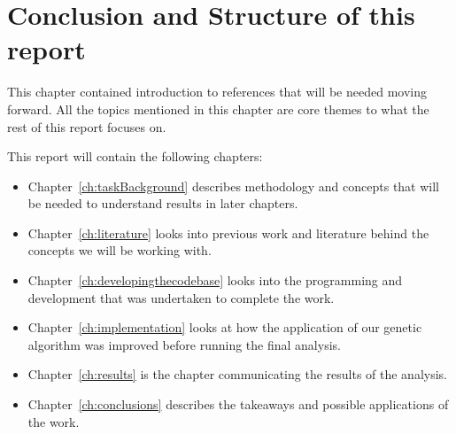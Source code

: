 \section{Conclusion and Structure of this report}
This chapter contained introduction to references that will be needed moving forward. 
All the topics mentioned in this chapter are core themes to what the rest of this report focuses on.

This report will contain the following chapters:
\begin{itemize}
    \item Chapter~\ref{ch:taskBackground} describes methodology and concepts that will be needed to understand results in later chapters.
    \item Chapter~\ref{ch:literature} looks into previous work and literature behind the concepts we will be working with.
    \item Chapter~\ref{ch:developingthecodebase} looks into the programming and development that was undertaken to complete the work.
    \item Chapter~\ref{ch:implementation} looks at how the application of our genetic algorithm was improved before running the final analysis.
    \item Chapter~\ref{ch:results} is the chapter communicating the results of the analysis.
    \item Chapter~\ref{ch:conclusions} describes the takeaways and possible applications of the work.
\end{itemize}